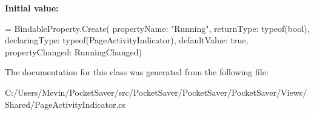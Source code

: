 {\bfseries Initial value\+:}
\begin{DoxyCode}
= BindableProperty.Create(
            propertyName: \textcolor{stringliteral}{"Running"},
            returnType: typeof(\textcolor{keywordtype}{bool}),
            declaringType: typeof(PageActivityIndicator),
            defaultValue: \textcolor{keyword}{true},
            propertyChanged: RunningChanged)
\end{DoxyCode}


The documentation for this class was generated from the following file\+:\begin{DoxyCompactItemize}
\item 
C\+:/\+Users/\+Mevin/\+Pocket\+Saver/src/\+Pocket\+Saver/\+Pocket\+Saver/\+Pocket\+Saver/\+Views/\+Shared/Page\+Activity\+Indicator.\+cs\end{DoxyCompactItemize}
